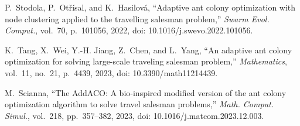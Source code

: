 P.~Stodola, P.~Ot\v{r}\'isal, and K.~Hasilov\'a,
``Adaptive ant colony optimization with node clustering applied to the travelling salesman problem,''
\textit{Swarm Evol. Comput.}, vol.~70, p.~101056, 2022,
doi: 10.1016/j.swevo.2022.101056.

K.~Tang, X.~Wei, Y.-H. Jiang, Z.~Chen, and L.~Yang,
``An adaptive ant colony optimization for solving large-scale traveling salesman problem,''
\textit{Mathematics}, vol.~11, no.~21, p.~4439, 2023,
doi: 10.3390/math11214439.

M.~Scianna,
``The AddACO: A bio-inspired modified version of the ant colony optimization algorithm to solve travel salesman problems,''
\textit{Math. Comput. Simul.}, vol.~218, pp.~357--382, 2023,
doi: 10.1016/j.matcom.2023.12.003.


